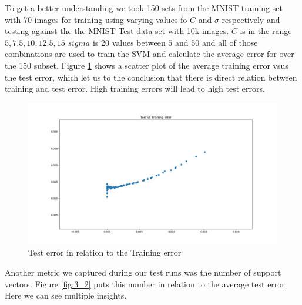 To get a better understanding we took 150 sets from the MNIST training set with 70 images for training using varying values fo $C$ and $\sigma$ respectively and testing against the the MNIST Test data set with 10k images. $C$ is in the range ${5, 7.5, 10, 12.5, 15}$ $sigma$ is 20 values between $5$ and $50$ and all of those combinations are used to train the SVM and calculate the average error for over the 150 subset. 
Figure \ref{fig:3_1} shows a scatter plot of the average training error vsus the  test error, which let us to the conclusion that there is direct  relation between training and test error. High training errors will lead to high test errors.
\begin{figure}[h]
\begin{center}
\centering
\includegraphics[width=1\textwidth]{figures/new/3_Figure_1}
\end{center}
\caption{\label{fig:3_1}  Test error in relation to the Training error  }
\end{figure}
Another metric we captured during our test runs was the number of support vectors. Figure \ref{fig:3_2} puts this number in relation to the average test error.  Here we can see multiple insights. 

